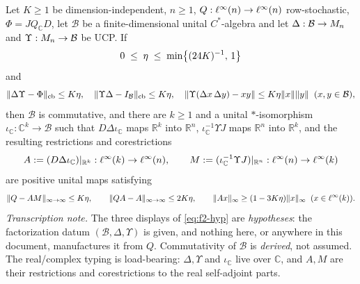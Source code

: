 \begin{lemma}\label{lem:routef-f2-positive-unital-compression}
Let $K\ge1$ be dimension-independent, $n\ge1$, $Q:\ell^{\infty}(n)\to\ell^{\infty}(n)$ row-stochastic,
$\Phi=JQ_{\mathbb C}D$, let $\mathcal B$ be a finite-dimensional unital $C^{*}$-algebra and
let $\Delta:\mathcal B\to M_{n}$ and $\Upsilon:M_{n}\to\mathcal B$ be UCP. If
\begin{equation}\label{eq:f2-window}
  0\;\le\;\eta\;\le\;\min\bigl\{(24K)^{-1},\,1\bigr\}
\end{equation}
and
\begin{equation}\label{eq:f2-hyp}
  \lVert \Delta\Upsilon-\Phi\rVert_{\mathrm{cb}}\le K\eta,
  \quad
  \lVert \Upsilon\Delta-I_{\mathcal B}\rVert_{\mathrm{cb}}\le K\eta,
  \quad
  \lVert \Upsilon(\Delta x\,\Delta y)-xy\rVert\le K\eta\lVert x\rVert\lVert y\rVert
  \;\;(x,y\in\mathcal B),
\end{equation}
then $\mathcal B$ is commutative, and there are $k\ge1$ and a unital $*$-isomorphism
$\iota_{\mathbb C}:\mathbb C^{k}\to\mathcal B$ such that $D\Delta\iota_{\mathbb C}$ maps
$\mathbb R^{k}$ into $\mathbb R^{n}$, $\iota_{\mathbb C}^{-1}\Upsilon J$ maps $\mathbb R^{n}$
into $\mathbb R^{k}$, and the resulting restrictions and corestrictions
\begin{equation}\label{eq:f2-AM}
  A:=(D\Delta\iota_{\mathbb C})|_{\mathbb R^{k}}:\ell^{\infty}(k)\to\ell^{\infty}(n),
  \qquad
  M:=(\iota_{\mathbb C}^{-1}\Upsilon J)|_{\mathbb R^{n}}:\ell^{\infty}(n)\to\ell^{\infty}(k)
\end{equation}
are positive unital maps satisfying
\begin{equation}\label{eq:f2-out}
  \lVert Q-AM \rVert_{\infty\to\infty}\le K\eta,
  \qquad
  \lVert QA-A \rVert_{\infty\to\infty}\le 2K\eta,
  \qquad
  \lVert Ax \rVert_{\infty}\ge(1-3K\eta)\lVert x \rVert_{\infty}\;\;(x\in\ell^{\infty}(k)).
\end{equation}
\emph{Transcription note.} The three displays of \eqref{eq:f2-hyp} are \emph{hypotheses}:
the factorization datum $(\mathcal B,\Delta,\Upsilon)$ is given, and nothing here, or
anywhere in this document, manufactures it from $Q$. Commutativity of $\mathcal B$ is
\emph{derived}, not assumed. The real/complex typing is load-bearing: $\Delta,\Upsilon$ and
$\iota_{\mathbb C}$ live over $\mathbb C$, and $A,M$ are their restrictions and
corestrictions to the real self-adjoint parts.
\end{lemma}

